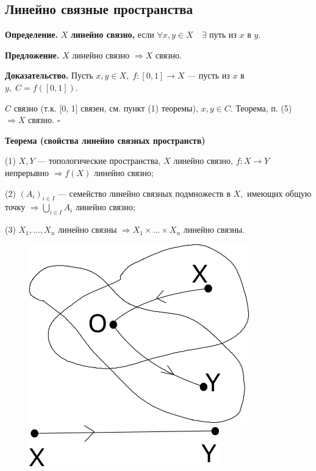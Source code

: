 \documentclass[12pt,a4paper]{article}
\begin{document}
\subsection{Линейно связные пространства}

\textbf{Определение.} $X$ \textbf{линейно связно,} если $\forall x, y \in X \quad \exists$ путь из $x$ в $y.$ 

\textbf{Предложение.} $X$ линейно связно $\Rightarrow X$ связно.

\textbf{Доказательство.} Пусть $x, y \in X, \; f: [0, 1] \to X$ --- пусть из $x$ в $y, \; C = f([0, 1]).$

$C$ связно (т.к. [0, 1] связен, см. пункт (1) теоремы), $x, y \in C.$ Теорема, п. (5) $\Rightarrow X$ связно. $\square$ 

\textbf{Теорема (свойства линейно связных пространств)}

(1) $X, Y$ --- топологические пространства, $X$ линейно связно, $f: X \to Y$ непрерывно $\Rightarrow f(X)$ линейно связно;

(2) $(A_{i})_{i \in I}$ --- семейство линейно связных подмножеств в $X,$ имеющих общую точку $\Rightarrow \underset{i \in I}{\bigcup} A_{i}$ линейно связно; 

(3) $X_{1}, ..., X_{n}$ линейно связны $\Rightarrow X_{1} \times ... \times X_{n}$ линейно связны. 

\begin{figure}
	\includegraphics[width=0.8\linewidth]{lect8_4.png}
	\includegraphics[width=0.8\linewidth]{lect8_5.png}
\end{figure}
\end{document}
